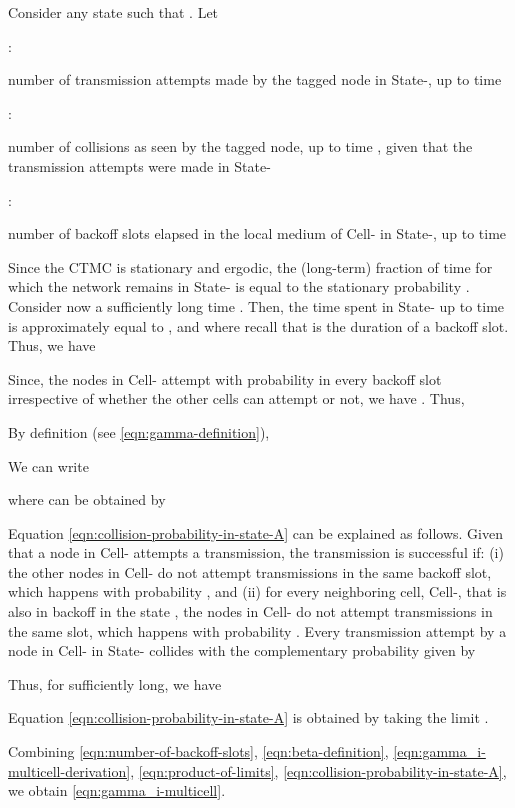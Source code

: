 \documentclass[10pt,a4paper,journal]{IEEEtran}
\theoremstyle{definition}
\theoremstyle{remark}
\theoremstyle{plain}
\begin{document}
Consider any state  such that . Let 

\vspace{1mm}

 : \parbox[t] {6cm} {number of transmission attempts made by the tagged node in State-, up to time } 

\vspace{1mm}

 : \parbox[t] {6cm} {number of collisions as seen by the tagged node, up to time , given that the transmission attempts were made in State-}

\vspace{1mm}

 : \parbox[t] {6cm} {number of backoff slots elapsed in the local medium of Cell- in State-, up to time }

\vspace{1mm}


Since the CTMC  is stationary and
ergodic, the (long-term) fraction of time for which the network
remains in State- is equal to the stationary probability
. Consider now a sufficiently long time . Then,
the time spent in State- up to time  is approximately
equal to , and  where recall that
 is the duration of a backoff slot. Thus, we have 


Since, the nodes in Cell- attempt with probability  in
every backoff slot irrespective of whether the other cells can attempt
or not, we have . Thus, 



By definition (see \eqref{eqn:gamma-definition}), 

We can write 

where  can be obtained by 



Equation \eqref{eqn:collision-probability-in-state-A} can be explained
as follows. Given that a node in Cell- attempts a transmission, the
transmission is successful if: (i) the  other nodes in Cell-
do not attempt transmissions in the same backoff slot, which happens
with probability , and (ii) for every neighboring
cell, Cell-, that is also in backoff in the state ,
the  nodes in Cell- do not attempt transmissions in the same
slot, which happens with probability . Every
transmission attempt by a node in Cell- in State-
collides with the complementary probability 
given by 
 
Thus, for  sufficiently long, we have 

Equation \eqref{eqn:collision-probability-in-state-A} is obtained by taking the
limit . 

Combining \eqref{eqn:number-of-backoff-slots}, \eqref{eqn:beta-definition}, \eqref{eqn:gamma_i-multicell-derivation}, \eqref{eqn:product-of-limits}, \eqref{eqn:collision-probability-in-state-A}, we obtain \eqref{eqn:gamma_i-multicell}. 






\end{document}
